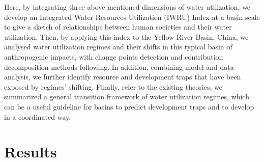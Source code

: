 \documentclass[9pt, twocolumn, twoside, lineno]{pnas-new}
\begin{document}
Here, by integrating three above mentioned dimensions of water utilization, 
we develop an Integrated Water Resources Utilization (IWRU) Index at a basin scale
to give a sketch of relationships between human societies and their water utilization.
Then, by applying this index to the Yellow River Basin, China,
we analysed water utilization regimes and their shifts in this typical basin of anthropogenic impacts, 
with change points detection and contribution decomposition methods following.
In addition, combining model and data analysis, 
we further identify resource and development traps that have been exposed by regimes' shifting.
Finally, refer to the existing theories, we summarized a general transition framework of water utilization regimes, 
which can be a useful guideline for basins to predict development traps and to develop in a coordinated way.


\section*{Results}
\end{document}
